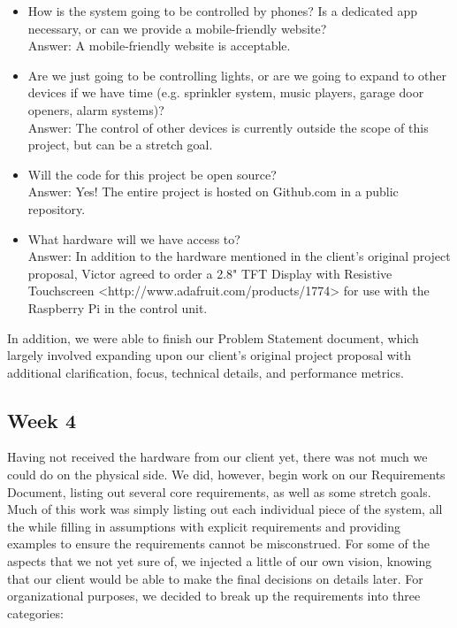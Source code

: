 \documentclass[letterpaper,10pt]{article}
\begin{document}
\begin{itemize}
    \item How is the system going to be controlled by phones?  Is a dedicated
        app necessary, or can we provide a mobile-friendly website?\\ Answer: A
        mobile-friendly website is acceptable.
    \item Are we just going to be controlling lights, or are we going to expand
        to other devices if we have time (e.g. sprinkler system, music players,
        garage door openers, alarm systems)?\\
        Answer: The control of other devices is currently outside the scope of
        this project, but can be a stretch goal.
    \item Will the code for this project be open source?\\
        Answer: Yes!  The entire project is hosted on Github.com in a public
        repository.
    \item What hardware will we have access to?\\
        Answer: In addition to the hardware mentioned in the client's original
        project proposal, Victor agreed to order a 2.8" TFT Display with
        Resistive Touchscreen <http://www.adafruit.com/products/1774> for use
        with the Raspberry Pi in the control unit.
\end{itemize}

In addition, we were able to finish our Problem Statement document, which
largely involved expanding upon our client's original project proposal with
additional clarification, focus, technical details, and performance metrics.

\subsection{Week 4}
 
Having not received the hardware from our client yet, there was not much we
could do on the physical side.  We did, however, begin work on our Requirements
Document, listing out several core requirements, as well as some stretch goals.
Much of this work was simply listing out each individual piece of the system,
all the while filling in assumptions with explicit requirements and providing
examples to ensure the requirements cannot be misconstrued.  For some of the
aspects that we not yet sure of, we injected a little of our own vision,
knowing that our client would be able to make the final decisions on details
later.  For organizational purposes, we decided to break up the requirements
into three categories:
\end{document}
